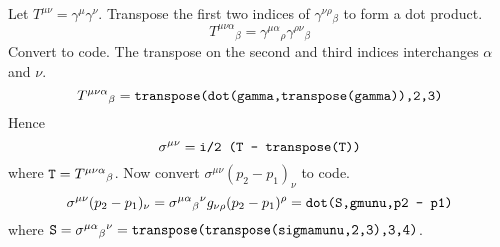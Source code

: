 \documentclass[12pt]{article}
\begin{document}
Let $T^{\mu\nu}=\gamma^\mu\gamma^\nu$.
Transpose the first two indices of $\gamma^{\nu\rho}{}_\beta$ to form a dot product.
$$
T^{\mu\nu\alpha}{}_\beta
=\gamma^{\mu\alpha}{}_\rho\gamma^{\rho\nu}{}_\beta
$$
Convert to code.
The transpose on the second and third indices interchanges $\alpha$ and $\nu$.
\begin{equation*}
T^{\mu\nu\alpha}{}_\beta
=\text{\tt transpose(dot(gamma,transpose(gamma)),2,3)}
\end{equation*}
Hence
\begin{equation*}
\sigma^{\mu\nu}=\text{\tt i/2 (T - transpose(T))}
\end{equation*}
where $\text{\tt T}=T^{\mu\nu\alpha}{}_\beta$.
%
Now convert $\sigma^{\mu\nu}(p_2-p_1)_\nu$ to code.
$$
\sigma^{\mu\nu}(p_2-p_1)_\nu
=\sigma^{\mu\alpha}{}_\beta{}^{\nu}g_{\nu\rho}(p_2-p_1)^\rho
=\text{\tt dot(S,gmunu,p2 - p1)}
$$
where $\text{\tt S}=\sigma^{\mu\alpha}{}_\beta{}^\nu
=\text{\tt transpose(transpose(sigmamunu,2,3),3,4)}$.

\newpage
{}
\end{document}
